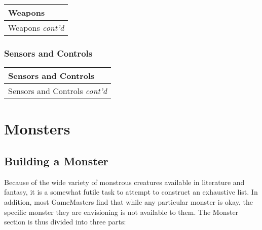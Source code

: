 \documentclass[twoside]{book}
\begin{document}
\begin{longtable}{p{1.25in}} 
  Weapons\\
  \hline
  \hline
  \endfirsthead
  Weapons \textit{cont'd}
         \\
  \hline
  \endhead

\end{longtable}
    
\begin{multicols}{2}
    
\end{multicols}
  
    

\subsection{Sensors and Controls}
    
\begin{longtable}{p{1.25in}} 
  Sensors and Controls\\
  \hline
  \hline
  \endfirsthead
  Sensors and Controls \textit{cont'd}
         \\
  \hline
  \endhead

\end{longtable}
    
\begin{multicols}{2}
    
\end{multicols}
  
    

\chapter{Monsters}
    
    

\section{Building a Monster}
    
    {  
     Because of the wide variety of monstrous creatures
             available in literature and fantasy, it is a somewhat futile
             task to attempt to construct an exhaustive list. In
             addition, most GameMasters find that while any particular
             monster is okay, the specific monster they are envisioning
             is not available to them. The Monster section is thus
             divided into three parts: 
    }
  
\begin{description}
    
  \item[] 
  \item[] 
  \item[] 
\end{description}
  
\end{document}
